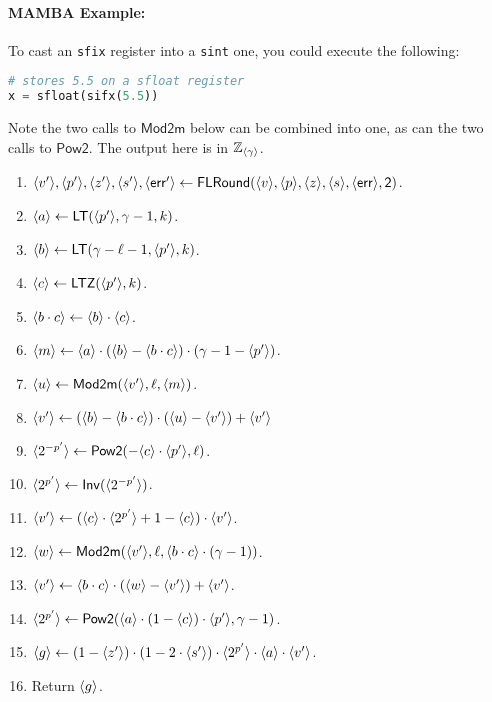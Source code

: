 \paragraph{MAMBA Example:} To cast an \verb|sfix| register into a \verb|sint| one, you could execute the following: 
\begin{lstlisting}[language={python}]
# stores 5.5 on a sfloat register
x = sfloat(sifx(5.5))
\end{lstlisting}
Note the two calls to $\mathsf{Mod2m}$ below can be combined into
one, as can the two calls to $\mathsf{Pow2}$.
The output here is in ${\mathbb{Z}}_{\langle \gamma \rangle}$.
\begin{enumerate}
\item $\langle v' \rangle,\langle p' \rangle,\langle z' \rangle,\langle s' \rangle,\langle \mathsf{err}' \rangle
	\leftarrow \mathsf{FLRound}(\langle v \rangle,\langle p \rangle,\langle z \rangle,\langle s \rangle,\langle \mathsf{err} \rangle,\mathsf{2})$. 
\item $\langle a \rangle \leftarrow \mathsf{LT}(\langle p' \rangle,\gamma-1,k)$.
\item $\langle b \rangle \leftarrow \mathsf{LT}(\gamma-\ell-1,\langle p' \rangle,k)$.
\item $\langle c \rangle \leftarrow \mathsf{LTZ}(\langle p' \rangle,k)$.
\item $\langle b \cdot c \rangle \leftarrow \langle b \rangle \cdot \langle c \rangle$.
\item $\langle m \rangle \leftarrow \langle a \rangle\cdot (\langle b \rangle -\langle b \cdot c \rangle)
		\cdot (\gamma-1-\langle p' \rangle)$.
\item $\langle u \rangle \leftarrow \mathsf{Mod2m}(\langle v' \rangle,\ell,\langle m \rangle)$.
\item $\langle v' \rangle \leftarrow (\langle b \rangle -\langle b \cdot c \rangle) \cdot ( \langle u \rangle-\langle v' \rangle) +\langle v' \rangle$
\item $\langle 2^{-p'} \rangle \leftarrow \mathsf{Pow2}(-\langle c \rangle \cdot \langle p' \rangle,\ell)$.
\item $\langle 2^{p'} \rangle \leftarrow \mathsf{Inv}(\langle 2^{-p'} \rangle)$.
\item $\langle v' \rangle \leftarrow (\langle c \rangle \cdot \langle 2^{p'} \rangle+1-\langle c \rangle)
			\cdot \langle v' \rangle$.
\item $\langle w \rangle \leftarrow \mathsf{Mod2m}(\langle v' \rangle,\ell,
		\langle b \cdot c \rangle\cdot(\gamma-1))$.
\item $\langle v' \rangle \leftarrow \langle b \cdot c \rangle \cdot (\langle w \rangle-\langle v' \rangle) +\langle v' \rangle$.
\item $\langle 2^{p'} \rangle \leftarrow \mathsf{Pow2}(\langle a \rangle \cdot (1-\langle c \rangle)
				\cdot \langle p' \rangle,\gamma-1)$.
\item $\langle g \rangle \leftarrow (1-\langle z' \rangle) \cdot (1-2 \cdot \langle s' \rangle)
			\cdot \langle 2^{p'} \rangle \cdot \langle a \rangle
			\cdot \langle v' \rangle$.
\item Return $\langle g \rangle$.
\end{enumerate}
